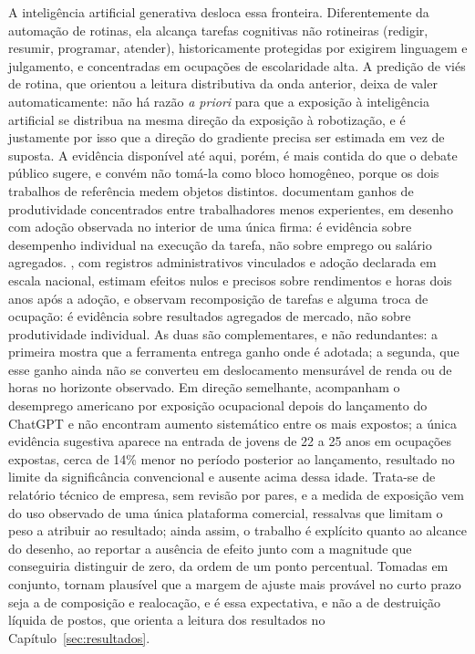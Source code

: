 A inteligência artificial generativa desloca essa fronteira. Diferentemente da
automação de rotinas, ela alcança tarefas cognitivas não rotineiras (redigir,
resumir, programar, atender), historicamente protegidas por exigirem
linguagem e julgamento, e concentradas em ocupações de escolaridade alta. A
predição de viés de rotina, que orientou a leitura distributiva da onda
anterior, deixa de valer automaticamente: não há razão \textit{a priori} para
que a exposição à inteligência artificial se distribua na mesma direção da
exposição à robotização, e é justamente por isso que a direção do gradiente
precisa ser estimada em vez de suposta. A evidência disponível até aqui, porém,
é mais contida do que o debate público sugere, e convém não tomá-la como bloco
homogêneo, porque os dois trabalhos de referência medem objetos distintos.
 documentam ganhos de produtividade concentrados
entre trabalhadores menos experientes, em desenho com adoção observada no
interior de uma única firma: é evidência sobre desempenho individual na execução
da tarefa, não sobre emprego ou salário agregados. , com
registros administrativos vinculados e adoção declarada em escala nacional,
estimam efeitos nulos e precisos sobre rendimentos e horas dois anos após a
adoção, e observam recomposição de tarefas e alguma troca de ocupação: é
evidência sobre resultados agregados de mercado, não sobre produtividade
individual. As duas são complementares, e não redundantes: a primeira mostra
que a ferramenta entrega ganho onde é adotada; a segunda, que esse ganho ainda
não se converteu em deslocamento mensurável de renda ou de horas no horizonte
observado. Em direção semelhante,  acompanham o
desemprego americano por exposição ocupacional depois do lançamento do ChatGPT e
não encontram aumento sistemático entre os mais expostos; a única evidência
sugestiva aparece na entrada de jovens de 22 a 25 anos em ocupações expostas,
cerca de 14\% menor no período posterior ao lançamento, resultado no limite da
significância convencional e ausente acima dessa idade. Trata-se de relatório
técnico de empresa, sem revisão por pares, e a medida de exposição vem do uso
observado de uma única plataforma comercial, ressalvas que limitam o peso a
atribuir ao resultado; ainda assim, o trabalho é explícito quanto ao alcance do
desenho, ao reportar a ausência de efeito junto com a magnitude que conseguiria
distinguir de zero, da ordem de um ponto percentual. Tomadas em conjunto, tornam plausível que a margem de ajuste mais
provável no curto prazo seja a de composição e realocação, e é essa expectativa,
e não a de destruição líquida de postos, que orienta a leitura dos
resultados no Capítulo~\ref{sec:resultados}.


